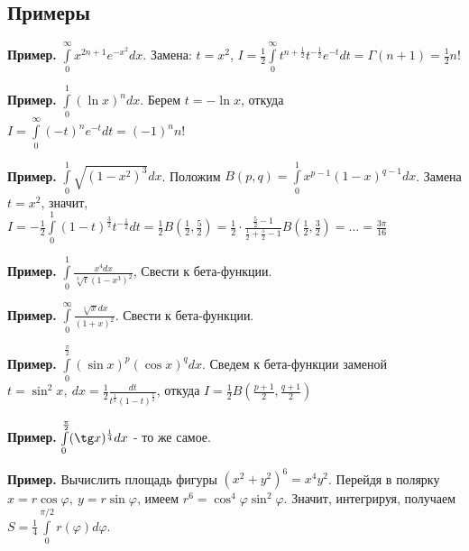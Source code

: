 \subsection{Примеры}
\textbf{Пример.} $\int\limits_{0}^{\infty} x^{2n+1}e^{-x^2}dx$. Замена:
$t=x^2$,  $I=\frac{1}{2}\int\limits_{0}^{\infty} t^{n+\frac{1}{2}}
t^{-\frac{1}{2}}e^{-t}dt=\Gamma(n+1)=\frac{1}{2}n!$ 

\textbf{Пример.} $\int\limits_{0}^{1} (\ln x)^ndx$. Берем $t=-\ln x$, откуда
$I=\int\limits_{0}^{\infty}(-t)^ne^{-t}dt=(-1)^nn!$

\textbf{Пример.} $\int\limits_{0}^{1}\sqrt{(1-x^2)^3}dx$. Положим
$B(p,q)=\int\limits_{0}^{1}x^{p-1}(1-x)^{q-1}dx$. Замена $t=x^2$, значит,
$I=-\frac{1}{2}\int\limits_{0}^{1}(1-t)^{\frac{3}{2}}t^{-\frac{1}{2}}dt=
\frac{1}{2}B(\frac{1}{2},\frac{5}{2})=\frac{1}{2}\cdot \frac{\frac{5}{2}-1}
{\frac{1}{2}+\frac{5}{2}-1}B(\frac{1}{2},\frac{3}{2})=...=
\frac{3\pi}{16}$ 

\textbf{Пример.} $\int\limits_{0}^{1} \frac{x^4dx}{\sqrt[3]t{(1-x^3)^2}}$,
Свести к бета-функции.

\textbf{Пример.} $\int\limits_{0}^{\infty}\frac{\sqrt[5]{x}dx}{(1+x)^2}$. 
Свести к бета-функции.

\textbf{Пример.} $\int\limits_{0}^{\frac{\pi}{2}}(\sin x)^p(\cos x)^qdx$.
Сведем к бета-функции заменой $t=\sin^2x,~dx=\frac{1}{2}\frac{dt}{
t^\frac{1}{2}(1-t)^\frac{1}{2}}$, откуда
$I=\frac{1}{2}B(\frac{p+1}{2},\frac{q+1}{2})$ 

\textbf{Пример.} $\int\limits_{0}^{\frac{\pi}{2}}(\tg x)^{\frac{1}{4}}dx$ - 
то же самое.

\textbf{Пример.} Вычислить площадь фигуры
$(x^2+y^2)^6=x^4y^2$. Перейдя в полярку  $x=r\cos\varphi,~y=r\sin\varphi$,
имеем $r^6=\cos^4\varphi\sin^2\varphi$.  Значит, интегрируя, 
получаем $S=\frac{1}{4}\int\limits_{0}^{\pi/2}r(\varphi)d\varphi$. 

















